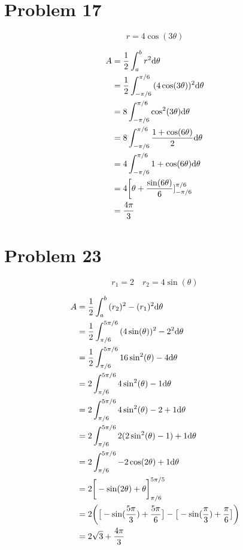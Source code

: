 \documentclass[letterpaper, 12pt]{math}
\begin{document}
\section*{Problem 17}
\[ r = 4\cos(3\theta) \]
\begin{center}
\end{center}
\begin{align*}
  A &= \frac{1}{2}\int_{a}^{b}{r^{2}\mathrm{d}{\theta}} \\
  &= \frac{1}{2}\int_{-\pi/6}^{\pi/6}{(4\cos(3\theta))^{2}\mathrm{d}{\theta}} \\
  &= 8\int_{-\pi/6}^{\pi/6}{\cos^{2}(3\theta)\mathrm{d}{\theta}} \\
  &= 8\int_{-\pi/6}^{\pi/6}{\frac{1+\cos(6\theta)}{2}\mathrm{d}{\theta}} \\
  &= 4\int_{-\pi/6}^{\pi/6}{1+\cos(6\theta)\mathrm{d}{\theta}} \\
  &= 4\bigg[\theta+\frac{\sin(6\theta)}{6}]_{-\pi/6}^{\pi/6} \\
  &= \frac{4\pi}{3}
\end{align*}

\section*{Problem 23}
\[ r_{1} = 2 \quad r_{2} = 4\sin(\theta) \]
\begin{center}
\end{center}
\begin{align*}
  A &= \frac{1}{2}\int_{a}^{b}{(r_{2})^{2}-(r_{1})^{2}\mathrm{d}{\theta}} \\
  &= \frac{1}{2}\int_{\pi/6}^{5\pi/6}{(4\sin(\theta))^{2}-2^{2}\mathrm{d}{\theta}} \\
  &= \frac{1}{2}\int_{\pi/6}^{5\pi/6}{16\sin^{2}(\theta)-4\mathrm{d}{\theta}} \\
  &= 2\int_{\pi/6}^{5\pi/6}{4\sin^{2}(\theta)-1\mathrm{d}{\theta}} \\
  &= 2\int_{\pi/6}^{5\pi/6}{4\sin^{2}(\theta)-2+1\mathrm{d}{\theta}} \\
  &= 2\int_{\pi/6}^{5\pi/6}{2(2\sin^{2}(\theta)-1)+1\mathrm{d}{\theta}} \\
  &= 2\int_{\pi/6}^{5\pi/6}{-2\cos(2\theta)+1\mathrm{d}{\theta}} \\
  &= 2\bigg[-\sin(2\theta)+\theta\bigg]_{\pi/6}^{5\pi/5} \\
  &= 2\bigg(\big[-\sin(\frac{5\pi}{3})+\frac{5\pi}{6}\big]-
    \big[-\sin(\frac{\pi}{3})+\frac{\pi}{6}\big]\bigg) \\
  &= 2\sqrt{3}+\frac{4\pi}{3}
\end{align*}
\end{document}
